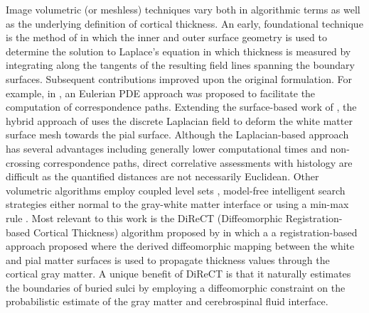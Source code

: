 Image volumetric (or meshless) techniques vary both in algorithmic terms as well as
the underlying definition of cortical thickness.  An early, foundational technique is the 
method of \cite{jones2000} in which the inner and outer surface geometry is used to determine the
solution to Laplace's equation in which thickness is measured by integrating along the 
tangents of the resulting field lines spanning the boundary surfaces.  Subsequent contributions
improved upon the original formulation.  For example, in \cite{yezzi2003}, an Eulerian PDE approach
was proposed to facilitate the computation of correspondence paths.  Extending the surface-based
work of \cite{macdonald2000}, the hybrid approach of
\cite{kim2005} uses the discrete Laplacian field to deform the white matter surface mesh towards the 
pial surface.    Although the Laplacian-based approach has several advantages
including generally lower computational times and 
non-crossing correspondence paths, direct correlative assessments with histology
are difficult as the quantified distances 
are not necessarily Euclidean.  Other volumetric algorithms employ coupled
level sets \citep{zeng1999}, model-free intelligent search strategies either normal to 
the gray-white matter interface \citep{scott2009} or using a min-max rule \citep{clement-vachet2011}.
Most relevant to this work is the DiReCT (Diffeomorphic Registration-based 
Cortical Thickness) algorithm proposed by \cite{das2009} in which a 
a registration-based approach proposed where the derived diffeomorphic mapping between the 
white and pial matter surfaces is used to propagate thickness values 
through the cortical gray matter.  A unique benefit of DiReCT is that it
naturally estimates the boundaries of buried sulci by employing a
diffeomorphic constraint on the probabilistic estimate of the gray
matter and cerebrospinal fluid interface.  

